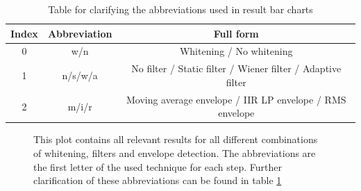 \begin{table} [h!]
\begin{tabular}{ccc}
Index & Abbreviation & Full form \\
\hline
0 & w/n & Whitening / No whitening \\
1 & n/s/w/a & No filter / Static filter / Wiener filter / Adaptive filter \\
2 & m/i/r & Moving average envelope / IIR LP envelope / RMS envelope \\
\end{tabular}
\caption{Table for clarifying the abbreviations used in result bar charts}
\label{tab:abbreviation_explanation}
\end{table}

\begin{figure}[h!t]
	\begin{center}
	\noindent{}
	\end{center}
	\caption{This plot contains all relevant results for all different combinations of whitening, filters and envelope detection. The abbreviations are the first letter of the used technique for each step. Further clarification of these abbreviations can be found in table \ref{tab:abbreviation_explanation}}
	\label{fig:result_all_lagerrorscaling}
\end{figure}

